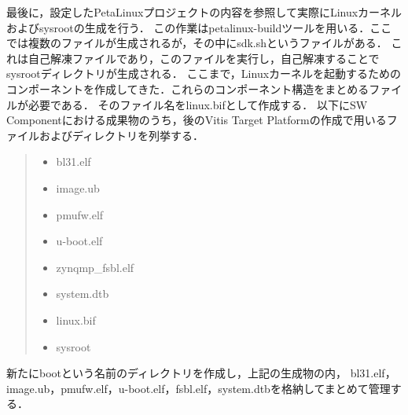 \documentclass[11pt,a4j]{jreport}
\begin{document}
最後に，設定したPetaLinuxプロジェクトの内容を参照して実際にLinuxカーネルおよびsysrootの生成を行う．
この作業はpetalinux-buildツールを用いる．ここでは複数のファイルが生成されるが，その中にsdk.shというファイルがある．
これは自己解凍ファイルであり，このファイルを実行し，自己解凍することでsysrootディレクトリが生成される．
ここまで，Linuxカーネルを起動するためのコンポーネントを作成してきた．これらのコンポーネント構造をまとめるファイルが必要である．
そのファイル名をlinux.bifとして作成する．
以下にSW Componentにおける成果物のうち，後のVitis Target Platformの作成で用いるファイルおよびディレクトリを列挙する．
\begin{quote}
  \begin{itemize}
    \item bl31.elf
    \item image.ub
    \item pmufw.elf
    \item u-boot.elf
    \item zynqmp_fsbl.elf
    \item system.dtb
    \item linux.bif
    \item sysroot
  \end{itemize}
\end{quote}
新たにbootという名前のディレクトリを作成し，上記の生成物の内，
bl31.elf，image.ub，pmufw.elf，u-boot.elf，fsbl.elf，system.dtbを格納してまとめて管理する．
\end{document}
